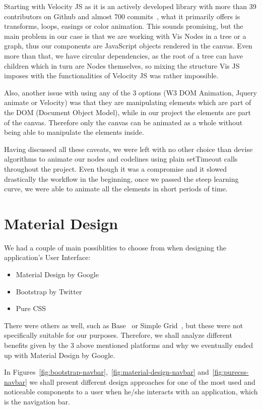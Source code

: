 \documentclass{l4proj}
\begin{document}
Starting with Velocity JS as it is an actively developed library with more than 39 contributors on Github and almost
700 commits~\cite{velocityjs}, what it primarily offers is transforms, loops, easings or color animation. This sounds
promising, but the main problem in our case is that we are working with Vis Nodes in a tree or a graph, thus our components
are JavaScript objects rendered in the canvas. Even more than that, we have circular dependencies, as the root of a tree can have children
which in turn are Nodes themselves, so mixing the structure Vis JS imposes with the functionalities of Velocity JS was
rather impossible.

Also, another issue with using any of the 3 options (W3 DOM Animation, Jquery animate or Velocity) was that they are
manipulating elements which are part of the DOM (Document Object Model), while in our project the elements are part of
the canvas. Therefore only the canvas can be animated as a whole without being able to manipulate the elements inside.

Having discussed all these caveats, we were left with no other choice than devise algorithms to animate our nodes and
codelines using plain setTimeout calls throughout the project. Even though it was a compromise and it slowed
drastically the workflow in the beginning, once we passed the steep learning curve, we were able to animate all the
elements in short periods of time.

\section{Material Design}

We had a couple of main possiblities to choose from when designing the application's User Interface:

\begin{itemize}
    \item Material Design by Google
    \item Bootstrap by Twitter
    \item Pure CSS
\end{itemize}

There were others as well, such as Base~\cite{base-ui} or Simple Grid~\cite{simple-grid-ui}, but these were not specifically suitable for
our purposes. Therefore, we shall analyze different benefits given by the 3 above mentioned platforms and why we
eventually ended up with Material Design by Google.

In Figures~\ref{fig:bootstrap-navbar},~\ref{fig:material-design-navbar} and~\ref{fig:purecss-navbar} we shall present
different design approaches for one of the most used and noticeable components to a user when he/she interacts with an
application, which is the navigation bar.
\end{document}
